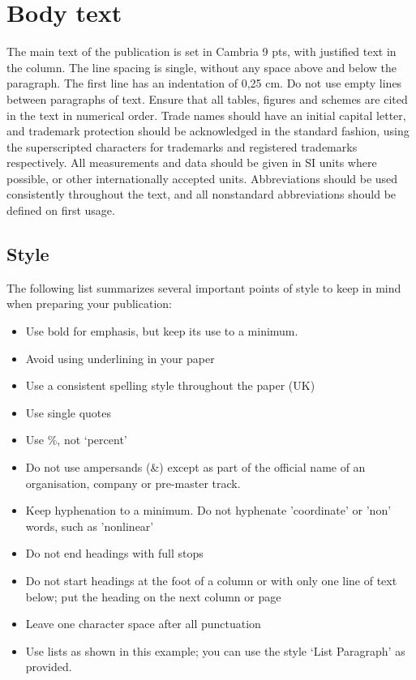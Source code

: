 \documentclass{paper}
\begin{document}
\section{Body text}

The main text of the publication is set in Cambria 9 pts, with justified text in the column.
The line spacing is single, without any space above and below the paragraph.
The first line has an indentation of 0,25 cm.
Do not use empty lines between paragraphs of text.
Ensure that all tables, figures and schemes are cited in the text in numerical order.
Trade names should have an initial capital letter, and trademark protection should be acknowledged in the standard fashion, using the superscripted characters for trademarks and registered trademarks respectively.
All measurements and data should be given in SI units where possible, or other internationally accepted units.
Abbreviations should be used consistently throughout the text, and all nonstandard abbreviations should be defined on first usage.

\subsection{Style}

The following list summarizes several important points of style to keep in mind when preparing your publication:

\begin{itemize}
    \item Use bold for emphasis, but keep its use to a minimum.
    \item Avoid using underlining in your paper
    \item Use a consistent spelling style throughout the paper (UK)
    \item Use single quotes
    \item Use \%, not ‘percent’
    \item Do not use ampersands (\&) except as part of the official name of an organisation, company or pre-master track.
    \item Keep hyphenation to a minimum. Do not hyphenate 'coordinate' or 'non' words, such as 'nonlinear'
    \item Do not end headings with full stops
    \item Do not start headings at the foot of a column or with only one line of text below; put the heading on the next column or page
    \item Leave one character space after all punctuation
    \item Use lists as shown in this example; you can use the style ‘List Paragraph’ as provided.
\end{itemize}
\end{document}
